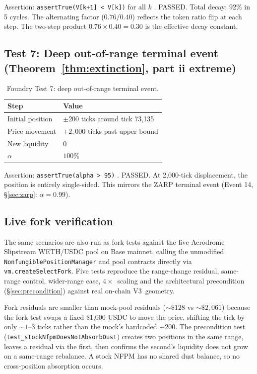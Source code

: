 \documentclass[11pt,a4paper]{article}
\begin{document}
Assertion: \texttt{assertTrue(V[k+1] < V[k])} for all $k$ . PASSED. Total decay: $92\%$ in 5 cycles. The alternating factor ($0.76 / 0.40$) reflects the token ratio flip at each step. The two-step product $0.76 \times 0.40 = 0.30$ is the effective decay constant.

\subsection{Test 7: Deep out-of-range terminal event (Theorem~\ref{thm:extinction}, part ii extreme)}\label{sec:foundry-terminal}

\begin{table}[H]
\centering
\caption{Foundry Test 7: deep out-of-range terminal event.}\label{tab:foundry-test7}
\begin{tabular}{@{}ll@{}}
\toprule
Step & Value \\
\midrule
Initial position & $\pm 200$ ticks around tick 73{,}135 \\
Price movement   & $+2{,}000$ ticks past upper bound \\
New liquidity    & 0 \\
$\alpha$ & $100\%$ \\
\bottomrule
\end{tabular}
\end{table}

Assertion: \texttt{assertTrue(alpha > 95)} . PASSED. At 2{,}000-tick displacement, the position is entirely single-sided. This mirrors the ZARP terminal event (Event 14, \S\ref{sec:zarp}: $\alpha = 0.99$).

\subsection{Live fork verification}\label{sec:foundry-fork}

The same scenarios are also run as fork tests against the live Aerodrome Slipstream WETH/\allowbreak{}USDC pool on Base mainnet, calling the unmodified \texttt{Nonfungible\-Position\-Manager} and pool contracts directly via \texttt{vm.create\-Select\-Fork}. Five tests reproduce the range-change residual, same-range control, wider-range case, $4\times$~scaling and the architectural precondition (\S\ref{sec:precondition}) against real on-chain V3~geometry.

Fork residuals are smaller than mock-pool residuals (${\sim}\$128$ vs ${\sim}\$2{,}061$) because the fork test swaps a fixed \$1{,}000 USDC to move the price, shifting the tick by only ${\sim}1$--$3$ ticks rather than the mock's hardcoded $+200$. The precondition test (\texttt{test\_stock\-Nfpm\-Does\-Not\-Absorb\-Dust}) creates two positions in the same range, leaves a residual via the first, then confirms the second's liquidity does not grow on a same-range rebalance. A stock NFPM has no shared dust balance, so no cross-position absorption occurs.
\end{document}

